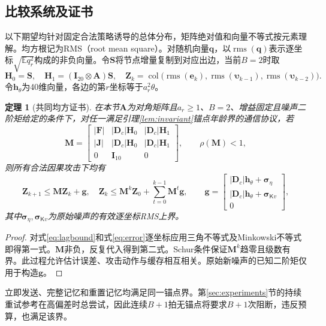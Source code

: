 \documentclass[UTF8,a4paper,zihao=5,fontset=windows]{ctexart}
\newtheorem{theorem}{定理}
\newcommand{\E}{\mathbb E}
\newcommand{\col}{\operatorname{col}}
\newcommand{\rms}{\operatorname{rms}}
\begin{document}
\subsection{比较系统及证书}
以下期望均针对固定合法策略诱导的总体分布，矩阵绝对值和向量不等式按元素理解。均方根记为RMS（root mean square）。对随机向量${\bm{q}}$，以$\rms({\bm{q}})$表示逐坐标$\sqrt{\E q_r^2}$构成的非负向量。令${\bm{S}}$将节点增量复制到对应出边，当前$B=2$时取
\[
{\bm{H}}_0={\bm{S}},\quad {\bm{H}}_1=({\bm{I}}_{20}\otimes {\bm{A}}){\bm{S}},\quad
{\bm{Z}}_k=\col\big(\rms({\bm{e}}_k),\rms({\bm{\upsilon}}_{k-1}),\rms({\bm{\upsilon}}_{k-2})\big).
\]
令${\bm{h}}_\theta$为40维向量，各边的第$r$坐标等于$a_r^2\theta$。
\begin{theorem}[共同均方证书]\label{thm:certificate}
在本节${\bm{A}}$为对角矩阵且$a_r\ge1$、$B=2$、增益固定且噪声二阶矩给定的条件下，对任一满足引理\ref{lem:invariant}锚点年龄界的通信协议，若
\begin{equation}
{\bm{M}}=
\begin{bmatrix}
|{\bm{F}}|&|{\bm{D}}_c|{\bm{H}}_0&|{\bm{D}}_c|{\bm{H}}_1\\
|{\bm{J}}|&|{\bm{D}}_c|{\bm{H}}_0&|{\bm{D}}_c|{\bm{H}}_1\\
0&{\bm{I}}_{10}&0
\end{bmatrix},
\qquad \rho({\bm{M}})<1,
\label{eq:matrix}
\end{equation}
则所有合法因果攻击下均有
\begin{equation}
{\bm{Z}}_{k+1}\le {\bm{M}}{\bm{Z}}_k+{\bm{g}},\quad
{\bm{Z}}_k\le {\bm{M}}^k{\bm{Z}}_0+\sum_{t=0}^{k-1}{\bm{M}}^t {\bm{g}},\qquad
{\bm{g}}=\begin{bmatrix}|{\bm{D}}_c|{\bm{h}}_\theta+{\bm{\sigma}}_\eta\\
|{\bm{D}}_c|{\bm{h}}_\theta+{\bm{\sigma}}_{\mathsf Kv}\\0\end{bmatrix},
\label{eq:comparison}
\end{equation}
其中${\bm{\sigma}}_\eta,{\bm{\sigma}}_{\mathsf Kv}$为原始噪声的有效逐坐标RMS上界。
\end{theorem}
\begin{proof}
对式\eqref{eq:lagbound}和式\eqref{eq:error}逐坐标应用三角不等式及Minkowski不等式即得第一式。${\bm{M}}$非负，反复代入得到第二式。Schur条件保证${\bm{M}}^k$趋零且级数有界。此过程允许估计误差、攻击动作与缓存相互相关。原始新噪声的已知二阶矩仅用于构造${\bm{g}}$。
\end{proof}

立即发送、完整记忆和重置记忆均满足同一锚点界。第\ref{sec:experiments}节的持续重试参考在高偏差时总尝试，因此连续$B+1$拍无锚点将要求$B+1$次阻断，违反预算，也满足该界。
\end{document}
